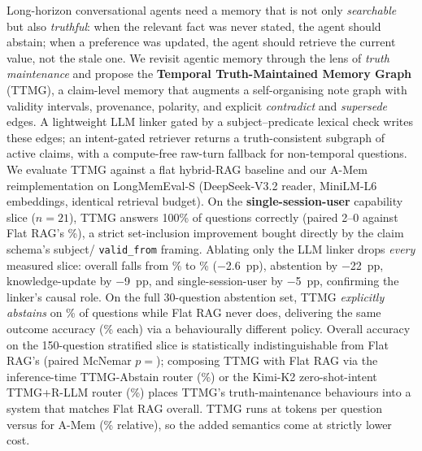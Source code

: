 Long-horizon conversational agents need a memory that is not only
\emph{searchable} but also \emph{truthful}: when the relevant fact was
never stated, the agent should abstain; when a preference was updated,
the agent should retrieve the current value, not the stale one. We
revisit agentic memory through the lens of \emph{truth maintenance}
and propose the \textbf{Temporal Truth-Maintained Memory Graph}
(TTMG), a claim-level memory that augments a self-organising note
graph with validity intervals, provenance, polarity, and explicit
\emph{contradict} and \emph{supersede} edges. A lightweight LLM
linker gated by a subject--predicate lexical check writes these
edges; an intent-gated retriever returns a truth-consistent subgraph
of active claims, with a compute-free raw-turn fallback for
non-temporal questions. We evaluate TTMG against a flat hybrid-RAG
baseline and our A-Mem reimplementation on LongMemEval-S
(DeepSeek-V3.2 reader, MiniLM-L6 embeddings, identical retrieval
budget).  On the \textbf{single-session-user} capability slice
($n{=}21$), TTMG answers 100\% of questions correctly (paired 2--0
against Flat RAG's \FlatLMEAccSSU\%), a strict set-inclusion
improvement bought directly by the claim schema's subject/
\texttt{valid\_from} framing. Ablating only the LLM linker drops
\emph{every} measured slice: overall falls from \TTMGLMEAcc\% to
\AblContradict\% ($-$2.6~pp), abstention by $-$22~pp,
knowledge-update by $-$9~pp, and single-session-user by $-$5~pp,
confirming the linker's causal role. On the full 30-question abstention set, TTMG
\emph{explicitly abstains} on \TTMGABSFullAbstainRate\% of
questions while Flat RAG never does, delivering the same outcome
accuracy (\TTMGABSFull\% each) via a behaviourally different
policy. Overall accuracy on the 150-question stratified slice is
statistically indistinguishable from Flat RAG's (paired McNemar
$p{=}$\McnemarOverall); composing TTMG with Flat RAG via the
inference-time TTMG-Abstain router (\AbstainRouterAcc\%) or the
Kimi-K2 zero-shot-intent TTMG+R-LLM router (\LLMRouterAcc\%) places
TTMG's truth-maintenance behaviours into a system that matches Flat
RAG overall. TTMG runs at \TTMGTokens{} tokens per question versus
\AmemTokens{} for A-Mem (\TokensOverhead\% relative), so the added
semantics come at strictly lower cost.
